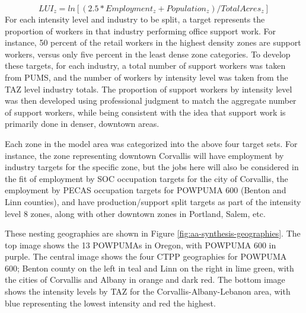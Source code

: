 \begin{itemize}
\begin{equation}
LUI_z = ln [(2.5*Employment_z  + Population_z)/Total Acres_z]
\end{equation}
\noindent For each intensity level and industry to be split, a target represents the proportion of workers in that industry performing office support work. For instance, 50 percent of the retail workers in the highest density zones are support workers, versus only five percent in the least dense zone categories. To develop these targets, for each industry, a total number of support workers was taken from PUMS, and the number of workers by intensity level was taken from the TAZ level industry totals. The proportion of support workers by intensity level was then developed using professional judgment to match the aggregate number of support workers, while being consistent with the idea that support work is primarily done in denser, downtown areas.
\end{itemize} 

Each zone in the model area was categorized into the above four target sets. For instance, the zone representing downtown Corvallis will have employment by industry targets for the specific zone, but the jobs here will also be considered in the fit of employment by SOC occupation targets for the city of Corvallis, the employment by PECAS occupation targets for POWPUMA 600 (Benton and Linn counties), and have production/support split targets as part of the intensity level 8 zones, along with other downtown zones in Portland, Salem, etc.

These nesting geographies are shown in Figure \ref{fig:aa-synthesis-geographies}. The top image shows the 13 POWPUMAs in Oregon, with POWPUMA 600 in purple. The central image shows the four CTPP geographies for POWPUMA 600; Benton county on the left in teal and Linn on the right in lime green, with the cities of Corvallis and Albany in orange and dark red. The bottom image shows the intensity levels by TAZ for the Corvallis-Albany-Lebanon area, with blue representing the lowest intensity and red the highest.

